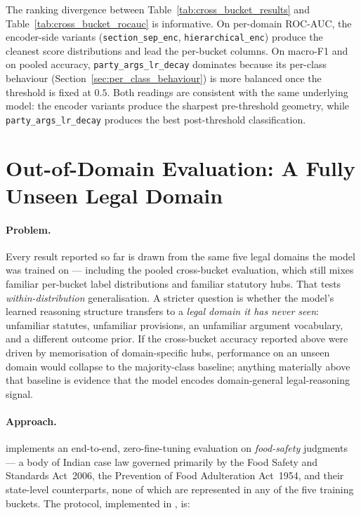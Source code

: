 The ranking divergence between Table~\ref{tab:cross_bucket_results}
and Table~\ref{tab:cross_bucket_rocauc} is informative. On per-domain
ROC-AUC, the encoder-side variants (\texttt{section\_sep\_enc},
\texttt{hierarchical\_enc}) produce the cleanest score distributions
and lead the per-bucket columns. On macro-F1 and on pooled accuracy,
\texttt{party\_args\_lr\_decay} dominates because its per-class
behaviour (Section~\ref{sec:per_class_behaviour}) is more balanced
once the threshold is fixed at $0.5$. Both readings are consistent
with the same underlying model: the encoder variants produce the
sharpest pre-threshold geometry, while
\texttt{party\_args\_lr\_decay} produces the best post-threshold
classification.

\section{Out-of-Domain Evaluation: A Fully Unseen Legal Domain}
\label{sec:cross_domain_food_safety}

\paragraph{Problem.}
Every result reported so far is drawn from the same five legal
domains the model was trained on --- including the pooled
cross-bucket evaluation, which still mixes familiar per-bucket label
distributions and familiar statutory hubs.  That tests
\emph{within-distribution} generalisation.  A stricter question is
whether the model's learned reasoning structure transfers to a
\emph{legal domain it has never seen}: unfamiliar statutes,
unfamiliar provisions, an unfamiliar argument vocabulary, and a
different outcome prior.  If the cross-bucket accuracy reported above
were driven by memorisation of domain-specific hubs, performance on
an unseen domain would collapse to the majority-class baseline;
anything materially above that baseline is evidence that the model
encodes domain-general legal-reasoning signal.

\paragraph{Approach.}
 implements an
end-to-end, zero-fine-tuning evaluation on \emph{food-safety}
judgments --- a body of Indian case law governed primarily by the
Food Safety and Standards Act~2006, the Prevention of Food
Adulteration Act~1954, and their state-level counterparts, none of
which are represented in any of the five training buckets.  The
protocol, implemented in , is:

